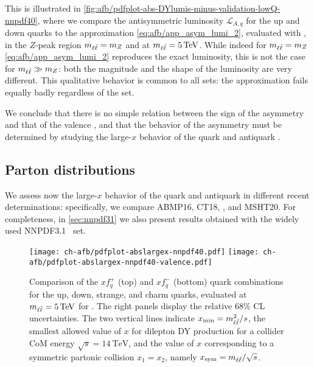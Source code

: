 This is illustrated in
\cref{fig:afb/pdfplot-abs-DYlumis-minus-validation-lowQ-nnpdf40}, where we
compare the antisymmetric luminosity $\mathcal{L}_{A,q}$ for the up and down
quarks  to the approximation \cref{eq:afb/app_asym_lumi_2}, evaluated with
 \nnlo, in the $Z$-peak region $m_{\ell\bar{\ell}}=m_Z$  and at
$\mll=\SI{5}{\tera\electronvolt}$.
%
While indeed for $m_{\ell\bar{\ell}}=m_Z$ \cref{eq:afb/app_asym_lumi_2} reproduces the exact
luminosity, this is not the case for $m_{\ell\bar{\ell}}\gg m_Z$: both the magnitude and the
shape of the luminosity are  very different.
%
This qualitative behavior is common to all \pdf sets: the approximation fails
equally badly regardless of the \pdf set.

We conclude that there is no simple relation between the sign of the asymmetry
and that of the valence \pdf, and that the behavior of the asymmetry must be
determined by studying the large-$x$ behavior of the quark and antiquark \pdfs.

\subsection{Parton distributions}
\label{sec:afb/subsec-largexPDFs}

We assess now the large-$x$ behavior of the quark and antiquark \pdfs in
different recent \pdf determinations: specifically, we compare ABMP16, CT18, 
, and MSHT20.
%
For completeness, in \cref{sec:nnpdf31} we also present results obtained with
the widely used NNPDF3.1~\cite{Ball:2017nwa} set.

\begin{figure}[!t]
  \centering
  \texttt{[image: ch-afb/pdfplot-abslargex-nnpdf40.pdf]}
  \texttt{[image: ch-afb/pdfplot-abslargex-nnpdf40-valence.pdf]}
  \caption{\small
    Comparison of the $xf^+_q$ (top) and $xf_q^-$ (bottom) quark \pdf
    combinations for the up, down, strange, and charm quarks, evaluated at
    $\mll=\SI{5}{\tera\electronvolt}$ for  \nnlo.
    The right panels display the relative 68\% CL uncertainties.
    The two vertical lines indicate $x_{\text{min}}=m_{\ell\bar{\ell}}^2/s$, the smallest
    allowed value of $x$  for dilepton DY production for a collider CoM energy
    $\sqrt{s}=\SI{14}{\tera\electronvolt}$, and the value of $x$ corresponding
    to a symmetric partonic collision $x_1=x_2$, namely
    $x_{\text{sym}}=m_{\ell\bar{\ell}}/\sqrt{s}$.
  }    
  \label{fig:afb/pdfplot-abslargex}
\end{figure}


